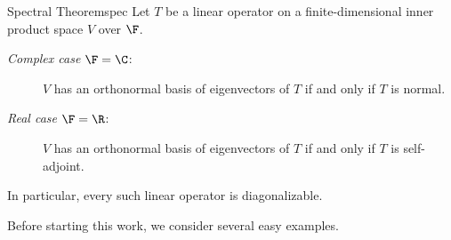 \begin{thm}{Spectral Theorem}{spec}
Let $T$ be a linear operator on a finite-dimensional inner product space $V$ over $\F$.
\begin{description}
  \item[\normalfont\emph{Complex case $\F=\C$}:] $V$ has an orthonormal basis of eigenvectors of $T$ if and only if $T$ is normal.
  \item[\normalfont\emph{Real case $\F=\R$}:] $V$ has an orthonormal basis of eigenvectors of $T$ if and only if $T$ is self-adjoint.
\end{description}
In particular, every such linear operator is diagonalizable.
\end{thm}

Before starting this work, we consider several easy examples.


